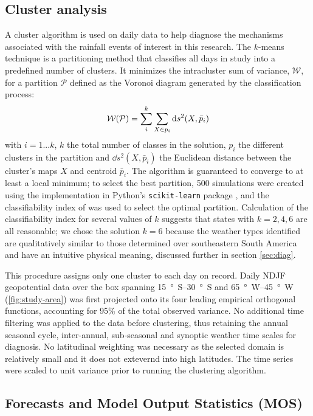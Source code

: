 \documentclass{ametsoc}
\begin{document}
\subsection{Cluster analysis}

A cluster algorithm is used on daily data to help diagnose the mechanisms associated with the rainfall events of interest in this research.
The $k$-means technique is a partitioning method that classifies all days in study into a predefined number of clusters.
It minimizes the intracluster sum of variance, $\mathcal{W}$, for a partition $\mathcal{P}$ defined as the Voronoi diagram generated by the classification process:
\begin{equation}
	\mathcal{W} \qty( \mathcal{P} ) = \sum_{i}^{k}\sum_{X\in p_{i}} \dd s^{2} \qty(X,\bar{p}_{i})
\end{equation}
with $i=1...k$,  $k$ the total number of classes in the solution, $p_i$ the different clusters in the partition and $\dd s^2(X,\bar{p}_i)$ the Euclidean distance between the cluster's maps $X$ and centroid $\bar{p}_i$.
The algorithm is guaranteed to converge to at least a local minimum; to select the best partition, 500 simulations were created using the implementation in Python's \texttt{scikit-learn} package \citep{Pedregosa:2012tv}, and the classifiability index of \citet{Michelangeli1995} was used to select the optimal partition.
Calculation of the classifiability index for several values of $k$ suggests that states with $k=2,4,6$ are all reasonable; we chose the solution $k=6$ because the weather types identified are qualitatively similar to those determined over southeastern South America \citep{Munoz2015,Munoz2016} and have an intuitive physical meaning, discussed further in section \ref{sec:diag}.

This procedure assigns only one cluster to each day on record.
Daily NDJF geopotential data over the box spanning \SIrange{15}{30}{\degree S} and \SIrange{65}{45}{\degree W} (\cref{fig:study-area}) was first projected onto its four leading empirical orthogonal functions, accounting for 95\% of the total observed variance.
No additional time filtering was applied to the data before clustering, thus retaining the annual seasonal cycle, inter-annual, sub-seasonal and synoptic weather time scales for diagnosis.
No latitudinal weighting was necessary as the selected domain is relatively small and it does not extevernd into high latitudes.
The time series were scaled to unit variance prior to running the clustering algorithm.

\subsection{Forecasts and Model Output Statistics (MOS)}
\end{document}
